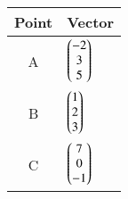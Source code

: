 \begin{tabular}{|c|p{3cm}|}
    \hline
    Point & Vector \\
    \hline
        A & $\begin{pmatrix}-2 \\ 3 \\ 5\end{pmatrix}$  \\
    \hline
        B & $\begin{pmatrix}1 \\ 2 \\ 3\end{pmatrix}$ \\
    \hline
        C & $\begin{pmatrix}7 \\ 0 \\ -1\end{pmatrix}$  \\
    \hline
\end{tabular}

